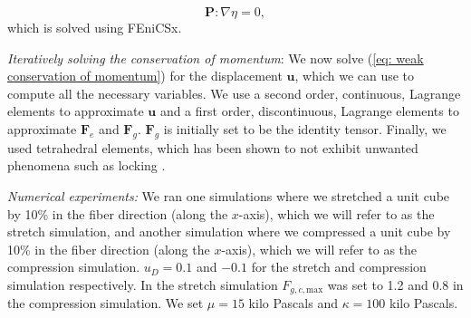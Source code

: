 \begin{equation}
\label{eq: weak conservation of momentum}
    \mathbf{P} : \nabla\eta = 0,
\end{equation}
which is solved using FEniCSx.
\par
\emph{Iteratively solving the conservation of momentum}: We now solve (\ref{eq: weak conservation of momentum}) for the displacement $\mathbf{u}$, which we can use to compute all the necessary variables. We use a second order, continuous, Lagrange elements to approximate $\mathbf{u}$ and a first order, discontinuous, Lagrange elements to approximate $\mathbf{F}_e$ and $\mathbf{F}_g$. $\mathbf{F}_g$ is initially set to be the identity tensor. Finally, we used tetrahedral elements, which has been shown to not exhibit unwanted phenomena such as locking \citep{oliveira2016comparison}. \par
\emph{Numerical experiments:} We ran one simulations where we stretched a unit cube by 10\% in the fiber direction (along the $x$-axis), which we will refer to as the stretch simulation, and another simulation where we compressed a unit cube by 10\% in the fiber direction (along the $x$-axis), which we will refer to as the compression simulation. $u_D = 0.1$ and $-0.1$ for the stretch and compression simulation respectively. In the stretch simulation $F_{g,c,\mathrm{max}}$ was set to 1.2 and 0.8 in the compression simulation. We set $\mu = 15$ kilo Pascals and $\kappa = 100$ kilo Pascals.
